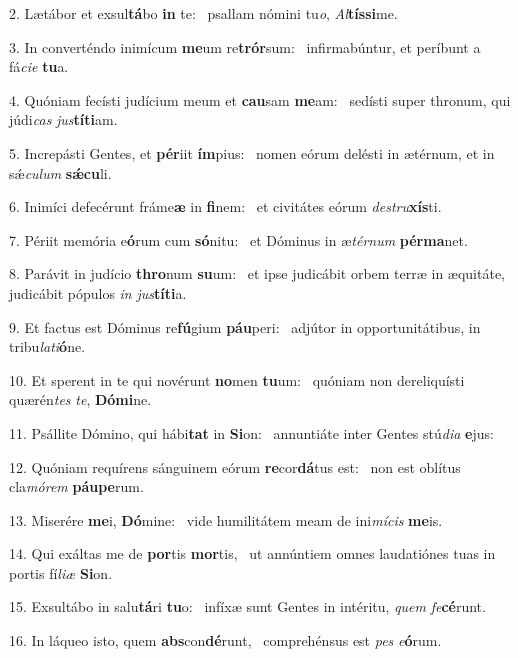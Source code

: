 2. Lætábor et exsul\textbf{tá}bo \textbf{in} te: \ast\  psallam nómini tu\textit{o}, \textit{Al}\textbf{tís}\textbf{si}me.\

3. In converténdo inimícum \textbf{me}um re\textbf{trór}sum: \ast\  infirmabúntur, et períbunt a fá\textit{ci}\textit{e} \textbf{tu}a.\

4. Quóniam fecísti judícium meum et \textbf{cau}sam \textbf{me}am: \ast\  sedísti super thronum, qui júdi\textit{cas} \textit{jus}\textbf{tí}\textbf{ti}am.\

5. Increpásti Gentes, et \textbf{pér}iit \textbf{ím}pius: \ast\  nomen eórum delésti in ætérnum, et in sǽ\textit{cu}\textit{lum} \textbf{sǽ}\textbf{cu}li.\

6. Inimíci defecérunt fráme\textbf{æ} in \textbf{fi}nem: \ast\  et civitátes eórum \textit{de}\textit{stru}\textbf{xís}ti.\

7. Périit memória e\textbf{ó}rum cum \textbf{só}nitu: \ast\  et Dóminus in æ\textit{tér}\textit{num} \textbf{pér}\textbf{ma}net.\

8. Parávit in judício \textbf{thro}num \textbf{su}um: \ast\  et ipse judicábit orbem terræ in æquitáte, judicábit pópulos \textit{in} \textit{jus}\textbf{tí}\textbf{ti}a.\

9. Et factus est Dóminus re\textbf{fú}gium \textbf{páu}peri: \ast\  adjútor in opportunitátibus, in tribu\textit{la}\textit{ti}\textbf{ó}ne.\

10. Et sperent in te qui novérunt \textbf{no}men \textbf{tu}um: \ast\  quóniam non dereliquísti quærén\textit{tes} \textit{te}, \textbf{Dó}\textbf{mi}ne.\

11. Psállite Dómino, qui hábi\textbf{tat} in \textbf{Si}on: \ast\  annuntiáte inter Gentes stú\textit{di}\textit{a} \textbf{e}jus:\

12. Quóniam requírens sánguinem eórum \textbf{re}cor\textbf{dá}tus est: \ast\  non est oblítus cla\textit{mó}\textit{rem} \textbf{páu}\textbf{pe}rum.\

13. Miserére \textbf{me}i, \textbf{Dó}mine: \ast\  vide humilitátem meam de ini\textit{mí}\textit{cis} \textbf{me}is.\

14. Qui exáltas me de \textbf{por}tis \textbf{mor}tis, \ast\  ut annúntiem omnes laudatiónes tuas in portis fí\textit{li}\textit{æ} \textbf{Si}on.\

15. Exsultábo in salu\textbf{tá}ri \textbf{tu}o: \ast\  infíxæ sunt Gentes in intéritu, \textit{quem} \textit{fe}\textbf{cé}runt.\

16. In láqueo isto, quem \textbf{abs}con\textbf{dé}runt, \ast\  comprehénsus est \textit{pes} \textit{e}\textbf{ó}rum.\


